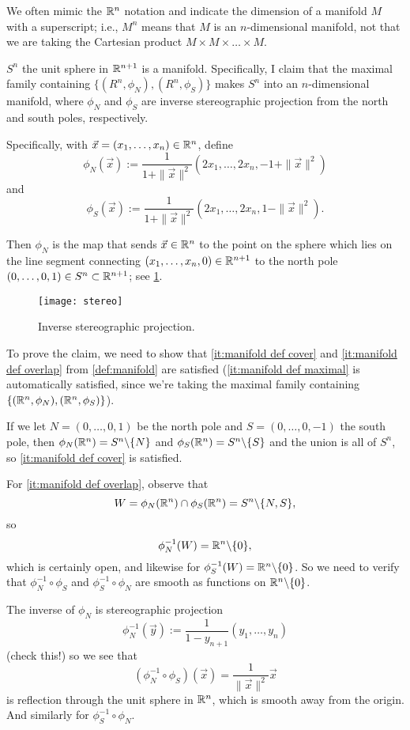 \begin{remark}
	We often mimic the $\mathbb{R}^n$ notation and indicate the dimension of a manifold $M$ with a superscript; i.e., $M^n$ means that $M$ is an $n$-dimensional manifold, not that we are taking the Cartesian product $M \times M \times \dots \times M$.
\end{remark}

\begin{example}
	$S^n$ the unit sphere in $\mathbb{R}^{n+1}$ is a manifold. Specifically, I claim that the maximal family containing $\{(R^n, \phi_N), (R^n, \phi_S)\}$ makes $S^n$ into an $n$-dimensional manifold, where $\phi_N$ and $\phi_S$ are inverse stereographic projection from the north and south poles, respectively. 
	
	Specifically, with $\vec{x} = (x_1, \dots , x_n) \in \mathbb{R}^n$, define
	\[
		\phi_N(\vec{x}) := \frac{1}{1+\|\vec{x}\|^2}\left(2x_1, \dots , 2x_n, -1+\|\vec{x}\|^2\right)
	\]
	and
	\[
		\phi_S(\vec{x}) := \frac{1}{1+\|\vec{x}\|^2}\left(2x_1, \dots , 2x_n, 1-\|\vec{x}\|^2\right).
	\]
	
	Then $\phi_N$ is the map that sends $\vec{x} \in \mathbb{R}^n$ to the point on the sphere which lies on the line segment connecting $(x_1,\dots , x_n, 0) \in \mathbb{R}^{n+1}$ to the north pole $(0, \dots , 0, 1) \in S^n \subset \mathbb{R}^{n+1}$; see \cref{fig:stereo}. 
	
	\begin{figure}[htbp]
		\centering
			\texttt{[image: stereo]}
		\caption{Inverse stereographic projection.}
		\label{fig:stereo}
	\end{figure}

To prove the claim, we need to show that \ref{it:manifold def cover} and \ref{it:manifold def overlap} from \cref{def:manifold} are satisfied (\ref{it:manifold def maximal} is automatically satisfied, since we're taking the maximal family containing $\{(\mathbb{R}^n, \phi_N), (\mathbb{R}^n, \phi_S)\}$). 

If we let $N = (0,\dots , 0, 1)$ be the north pole and $S = (0,\dots , 0, -1)$ the south pole, then $\phi_N(\mathbb{R}^n) = S^n \backslash\{N\}$ and $\phi_S(\mathbb{R}^n) = S^n \backslash\{S\}$ and the union is all of $S^n$, so \ref{it:manifold def cover} is satisfied.

For \ref{it:manifold def overlap}, observe that
\[
	W = \phi_N(\mathbb{R}^n) \cap \phi_S(\mathbb{R}^n) = S^n \backslash\{N,S\},
\]
so 
\[
	\phi_N^{-1}(W) = \mathbb{R}^n \backslash\{0\},
\]
which is certainly open, and likewise for $\phi_S^{-1}(W) = \mathbb{R}^n \backslash\{0\}$. So we need to verify that $\phi_N^{-1} \circ \phi_S$ and $\phi_S^{-1} \circ \phi_N$ are smooth as functions on $\mathbb{R}^n \backslash\{0\}$.

The inverse of $\phi_N$ is stereographic projection 
\[
	\phi_N^{-1}(\vec{y}) := \frac{1}{1-y_{n+1}} (y_1, \dots , y_n)
\]
(check this!) so we see that
\[
	(\phi_N^{-1} \circ \phi_S)(\vec{x}) = \frac{1}{\|\vec{x}\|^2}\vec{x}
\]
is reflection through the unit sphere in $\mathbb{R}^n$, which is smooth away from the origin. And similarly for $\phi_S^{-1} \circ \phi_N$.
\end{example}

